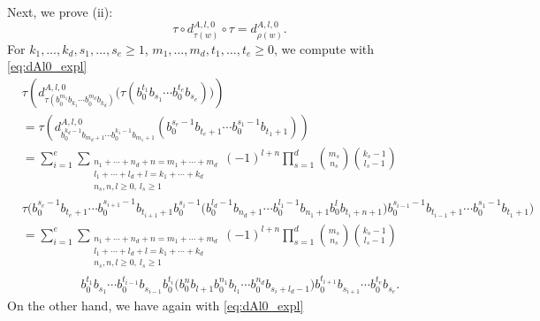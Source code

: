 \documentclass[12pt,reqno]{amsart}
\numberwithin{equation}{section}
\theoremstyle{definition}
\newcommand{\derlzero}[1]{d_{#1}^{A,l,0}}
\begin{document}
Next, we prove (ii):
\[\tau\circ \derlzero{\tau(w)}\circ \tau=\derlzero{\rho(w)}.\] 
For $k_1,\ldots,k_d,s_1,\ldots,s_e\geq1$, $m_1,\ldots,m_d,t_1,\ldots,t_e\geq0$, we compute with \eqref{eq:dAl0_expl}
\begin{align}  \label{eq:dAl0_tau}
&\tau\left(\derlzero{\tau(b_0^{m_1}b_{k_1}\cdots b_0^{m_d}b_{k_d})}\big(\tau(b_0^{t_1}b_{s_1}\cdots b_0^{t_e}b_{s_e})\big)\right) \nonumber\\
&=\tau\left(\derlzero{b_0^{k_d-1}b_{m_d+1}\cdots b_0^{k_1-1}b_{m_1+1}}(b_0^{s_e-1}b_{t_e+1}\cdots b_0^{s_1-1}b_{t_1+1})\right) \nonumber\\
&= \sum_{i=1}^e \sum_{\substack{n_1+\cdots+n_d+n=m_1+\cdots+m_d \\ l_1+\cdots+l_d+l=k_1+\cdots+k_d \\ n_s,n,l\geq0,\ l_s\geq1}} (-1)^{l+n} \prod_{s=1}^d \binom{m_s}{n_s}\binom{k_s-1}{l_s-1} \nonumber\\
&\tau\big(b_0^{s_e-1}b_{t_e+1}\cdots b_0^{s_{i+1}-1}b_{t_{i+1}+1}b_0^{s_i-1}\big(b_0^{l_d-1}b_{n_d+1}\cdots b_0^{l_1-1}b_{n_1+1}b_0^lb_{t_i+n+1}\big)b_0^{s_{i-1}-1}b_{t_{i-1}+1}\cdots b_0^{s_1-1}b_{t_1+1}\big) \nonumber\\
&=\sum_{i=1}^e \sum_{\substack{n_1+\cdots+n_d+n=m_1+\cdots+m_d \\ l_1+\cdots+l_d+l=k_1+\cdots+k_d \\ n_s,n,l\geq0,\ l_s\geq1}} (-1)^{l+n} \prod_{s=1}^d \binom{m_s}{n_s}\binom{k_s-1}{l_s-1}  \\
&\hspace{2cm}b_0^{t_1}b_{s_1}\cdots b_0^{t_{i-1}}b_{s_{i-1}}b_0^{t_i}\big(b_0^nb_{l+1}b_0^{n_1}b_{l_1}\cdots b_0^{n_d}b_{s_i+l_d-1}\big)b_0^{t_{i+1}}b_{s_{i+1}}\cdots b_0^{t_e}b_{s_e}. \nonumber
\end{align}
On the other hand, we have again with \eqref{eq:dAl0_expl}
\end{document}
